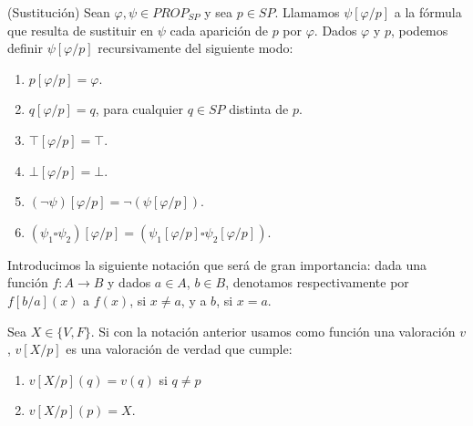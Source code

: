 \begin{definition}\label{def:sust}(Sustitución) Sean $\varphi, \psi \in PROP_{SP}$ y sea $p \in SP$. Llamamos $\psi[\varphi / p]$ a la fórmula que resulta de sustituir en $\psi$ cada aparición de $p$ por $\varphi$. Dados $\varphi$ y $p$, podemos definir $\psi[\varphi / p]$ recursivamente del siguiente modo:
\begin{enumerate}
    \item $p[\varphi/p] = \varphi$.
    \item $q[\varphi/p] = q$, para cualquier $q \in SP$ distinta de $p$.
    \item $\top[\varphi/p] = \top$.
    \item $\bot[\varphi/p] = \bot$.
    \item $(\neg\psi)[\varphi/p] = \neg(\psi[\varphi/p])$.
    \item $(\psi_1 \square \psi_2)[\varphi/p] = (\psi_1[\varphi/p] \square \psi_2[\varphi/p])$.
\end{enumerate}
\end{definition}

Introducimos la siguiente notación que será de gran importancia: dada una función $f:A \rightarrow B$ y dados $a\in A$, $b \in B$, denotamos respectivamente por $f[b/a](x)$ a $f(x)$, si $x \neq a$, y a $b$, si $x = a$.

\begin{example}
Sea $X\in \{V,F\}$. Si con la notación anterior usamos como función una valoración $v$, $v[X/p]$ es una valoración de verdad que cumple:
\begin{enumerate}[label=\bullet]
\item $v[X/p](q)=v(q)$ si $q\neq p$
\item $v[X/p](p)=X$.
\end{enumerate}
\end{example}


